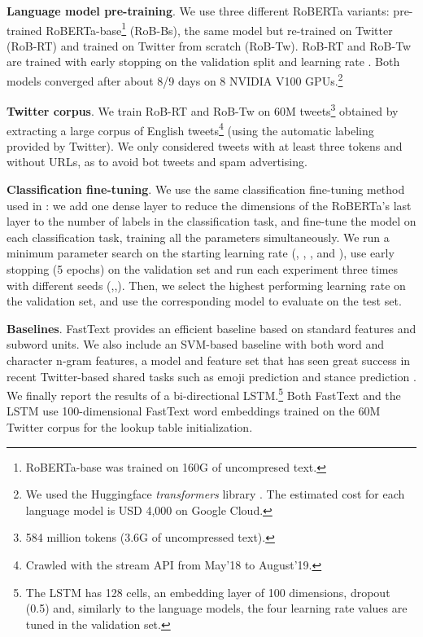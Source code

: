 \documentclass[11pt,a4paper]{article}
\begin{document}
\noindent \textbf{Language model pre-training}. We use three different RoBERTa variants: 
pre-trained RoBERTa-base\footnote{RoBERTa-base was trained on 160G of uncompresed text.} (RoB-Bs), the same model but re-trained on Twitter (RoB-RT) and trained on Twitter from scratch (RoB-Tw). RoB-RT and RoB-Tw are trained with early stopping on the validation split and learning rate . Both models converged after about 8/9 days on 8 NVIDIA V100 GPUs.\footnote{We used the Huggingface \textit{transformers} library . The estimated cost for each language model is USD 4,000 on Google Cloud.}

\noindent \textbf{Twitter corpus}. We train RoB-RT and RoB-Tw on 60M tweets\footnote{584 million tokens (3.6G of uncompressed text).} obtained by extracting a large corpus of English tweets\footnote{Crawled with the stream API from May'18 to August'19.} (using the automatic labeling provided by Twitter). We only considered tweets with at least three tokens and without URLs, as to avoid bot tweets and spam advertising.

\noindent \textbf{Classification fine-tuning}. We use the same classification fine-tuning method used in : we add one dense layer to reduce the dimensions of the RoBERTa's last layer to the number of labels in the classification task, and fine-tune the model on each classification task, training all the parameters simultaneously. We run a minimum parameter search on the starting learning rate (, , , and ), use early stopping (5 epochs) on the validation set and run each experiment three times with different seeds (,,). Then, we select the highest performing learning rate on the validation set, and use the corresponding model to evaluate on the test set. 

\noindent \textbf{Baselines}. FastText \cite{joulin-etal-2017-bag} provides an efficient baseline based on standard features and subword units. We also include an SVM-based baseline with both word and character n-gram features, a model and feature set that has seen great success in recent Twitter-based shared tasks such as emoji prediction \cite{ccoltekin2018tubingen} and stance prediction \cite{mohammad2018semeval}. We finally report the results of a bi-directional LSTM.\footnote{The LSTM has 128 cells, an embedding layer of 100 dimensions, dropout (0.5) and, similarly to the language models, the four learning rate values are tuned in the validation set.} Both FastText and the LSTM use 100-dimensional FastText word embeddings \cite{bojanowski-etal-2017-enriching} trained on the 60M Twitter corpus for the lookup table initialization.
\end{document}
